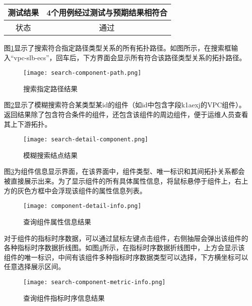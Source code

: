 \begin{table}[htbp]
\begin{tabular}{cc}
    测试结果 & 4个用例经过测试与预期结果相符合                                                                                                                                                                                     \\ \midrule[1pt]
    状态   & 通过                                                                                                                                                                                                   \\ \bottomrule[2pt]
    \end{tabular}
\end{table}

图\ref{search-component-path}显示了搜索符合指定路径类型关系的所有拓扑路径。如图所示，在搜索框输入“vpc-slb-ecs”，回车后，下方界面会显示所有符合该路径类型关系的拓扑路径。
\begin{figure}[hbtp]
    \centering
    \texttt{[image: search-component-path.png]}
    \caption{搜索指定路径结果\label{search-component-path}}
\end{figure}

图\ref{search-detail-component}显示了模糊搜索符合某类型某id的组件（如id中包含字段k1aexj的VPC组件）。返回结果除了包含符合条件的组件，还包含该组件的周边组件，便于运维人员查看其上下游拓扑。
\begin{figure}[htbp]
    \centering
    \texttt{[image: search-detail-component.png]}
    \caption{模糊搜索结点结果\label{search-detail-component}}
\end{figure}

图\ref{component-detail-info}为组件信息显示界面，在该界面中，组件类型、唯一标识和其间拓扑关系都会被直接展示出来。为了显示组件的所有具体属性信息，将鼠标悬停于组件上，右上方的灰色方框中会浮现该组件的属性信息列表。
\begin{figure}[htbp]
    \centering
    \texttt{[image: component-detail-info.png]}
    \caption{查询组件属性信息结果\label{component-detail-info}}
\end{figure}

对于组件的指标时序数据，可以通过鼠标左键点击组件，右侧抽屉会弹出该组件的各种指标时序数据折线图。如图\ref{search-component-metric-info}所示，在指标时序数据折线图中，上方会显示该组件的唯一标识，中间有该组件多种指标时序数据类型可以选择，下方横坐标可以任意选择展示区间。
\begin{figure}[htbp]
    \centering
    \texttt{[image: search-component-metric-info.png]}
    \caption{查询组件指标时序信息结果\label{search-component-metric-info}}
\end{figure}

